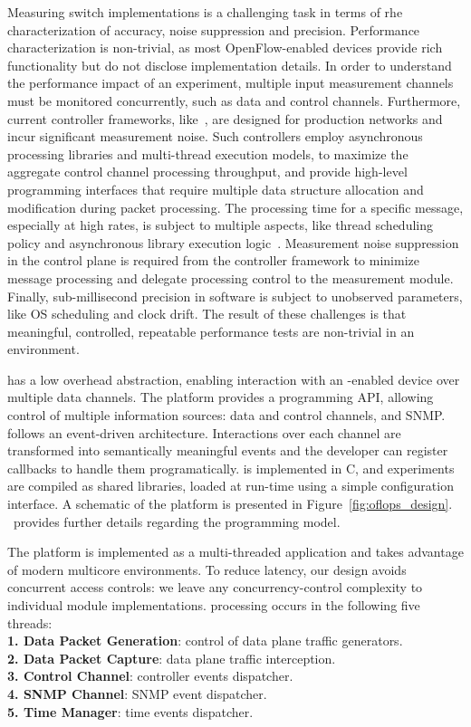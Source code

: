 Measuring \of switch implementations is a challenging task in terms of
rhe characterization of accuracy, noise suppression and precision.  Performance
characterization is non-trivial, as most OpenFlow-enabled devices provide rich
functionality but do not disclose implementation details. In order to understand
the performance impact of an experiment, multiple input measurement channels
must be monitored concurrently, such as data and control channels. Furthermore,
current controller frameworks, like~, are designed for
production networks and incur significant measurement noise. Such controllers
employ asynchronous processing libraries and multi-thread execution models, to
maximize the aggregate control channel processing throughput, and provide
high-level programming interfaces that require multiple data structure
allocation and modification during packet processing.  The processing time for a
specific \of message, especially at high rates, is subject to multiple aspects,
like thread scheduling policy and asynchronous library execution
logic~.  Measurement noise suppression in the control plane
is required from the controller framework to minimize message processing and
delegate processing control to the measurement module.  Finally, sub-millisecond
precision in software is subject to unobserved parameters, like OS scheduling
and clock drift. The result of these challenges is that meaningful, controlled,
repeatable performance tests are non-trivial in an \of environment.

\oflops has a low overhead abstraction, enabling interaction with
an \of-enabled device over multiple data channels.  The platform provides a
programming API, allowing control of multiple information sources: data and
control channels, and SNMP\@.  \oflops follows an event-driven
architecture. Interactions over each channel are transformed into semantically
meaningful events and the developer can register callbacks to handle them
programatically.  \oflops is implemented in C, and experiments are compiled as
shared libraries, loaded at run-time using a simple configuration interface.  A
schematic of the platform is presented in Figure~\ref{fig:oflops_design}.
~provides further details regarding the \oflops programming
model.

The platform is implemented as a multi-threaded application and takes
advantage of modern multicore environments. To reduce latency, our design
avoids concurrent access controls: we leave any concurrency-control complexity 
to individual module implementations. \oflops processing occurs in the following
five threads:\\
\textbf{1. Data Packet Generation}: control of data plane traffic generators.\\
\textbf{2. Data Packet Capture}: data plane traffic interception.\\
\textbf{3. Control Channel}: controller events dispatcher.\\
\textbf{4. SNMP Channel}: SNMP event dispatcher.\\
\textbf{5. Time Manager}: time events dispatcher.

